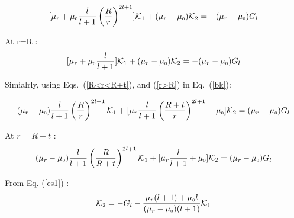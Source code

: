 $$[\mu_r+\mu_{\scriptscriptstyle 0}\frac{l}{l+1}\left(\dfrac{R}{r}\right)^{2l+1}]\mathcal{K}_1 +(\mu_r-\mu_{\scriptscriptstyle 0})\mathcal{K}_2=-(\mu_r-\mu_{\scriptscriptstyle 0})G_l$$

At r=R :
\begin{equation}\label{es1}
[\mu_r+\mu_{\scriptscriptstyle 0}\frac{l}{l+1}]\mathcal{K}_1 +(\mu_r-\mu_{\scriptscriptstyle 0})\mathcal{K}_2=-(\mu_r-\mu_{\scriptscriptstyle 0})G_l
\end{equation}

Simialrly, using Eqs.~(\ref{R<r<R+t}), and (\ref{r>R}) in Eq.~(\ref{bk}):


$$(\mu_r-\mu_{\scriptscriptstyle 0})\frac{l}{l+1}\left(\dfrac{R}{r}\right)^{2l+1}\mathcal{K}_1+[\mu_r\frac{l}{l+1}\left(\dfrac{R+t}{r}\right)^{2l+1}+\mu_{\scriptscriptstyle 0}]\mathcal{K}_2=(\mu_r-\mu_{\scriptscriptstyle 0})G_l$$

At $r=R+t$ :
\begin{equation}\label{es2}
(\mu_r-\mu_{\scriptscriptstyle 0})\frac{l}{l+1}\left(\dfrac{R}{R+t}\right)^{2l+1}\mathcal{K}_1+[\mu_r\frac{l}{l+1}+\mu_{\scriptscriptstyle 0}]\mathcal{K}_2=(\mu_r-\mu_{\scriptscriptstyle 0})G_l
\end{equation}

From Eq. (\ref{es1}) :
\begin{equation}\label{k2}
\mathcal{K}_2=-G_l-\frac{\mu_r(l+1)+\mu_{\scriptscriptstyle 0} l}{(\mu_r-\mu_{\scriptscriptstyle 0})(l+1)}\mathcal{K}_1
\end{equation}

